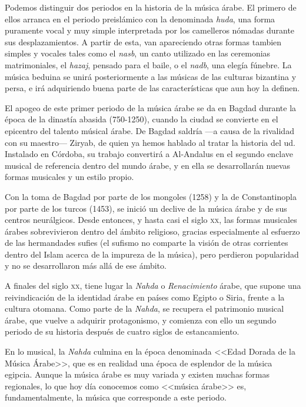     Podemos distinguir dos periodos en la historia de la música árabe. El primero de ellos arranca en el periodo preislámico con la denominada \emph{huda}, una forma puramente vocal y muy simple interpretada por los camelleros nómadas durante sus desplazamientos. A partir de esta, van apareciendo otras formas tambien simples y vocales tales como el \emph{nasb}, un canto utilizado en las ceremonias matrimoniales, el \emph{hazaj}, pensado para el baile, o el \emph{nadb}, una elegía fúnebre. La música beduina se unirá posteriormente a las músicas de las culturas bizantina y persa, e irá adquiriendo buena parte de las características que aun hoy la definen.

    El apogeo de este primer periodo de la música árabe se da en Bagdad durante la época de la dinastía abasida (750-1250), cuando la ciudad se convierte en el epicentro del talento músical árabe. De Bagdad saldría ---a causa de la rivalidad con su maestro--- Ziryab, de quien ya hemos hablado al tratar la historia del ud. Instalado en Córdoba, su trabajo convertirá a Al-Andalus en el segundo enclave musical de referencia dentro del mundo árabe, y en ella se desarrollarán nuevas formas musicales y un estilo propio.

    Con la toma de Bagdad por parte de los mongoles (1258) y la de Constantinopla por parte de los turcos (1453), se inició un declive de la música árabe y de sus centros neurálgicos. Desde entonces, y hasta casi el siglo \textsc{xx}, las formas musicales árabes sobrevivieron dentro del ámbito religioso, gracias especialmente al esfuerzo de las hermandades sufies (el sufismo no comparte la visión de otras corrientes dentro del Islam acerca de la impureza de la música), pero perdieron popularidad y no se desarrollaron más allá de ese ámbito.

    A finales del siglo \textsc{xx}, tiene lugar la \emph{Nahda} o \emph{Renacimiento} árabe, que supone una reivindicación de la identidad árabe en países como Egipto o Siria, frente a la cultura otomana. Como parte de la \emph{Nahda}, se recupera el patrimonio musical árabe, que vuelve a adquirir protagonismo, y comienza con ello un segundo periodo de su historia después de cuatro siglos de estancamiento.

    En lo musical, la \emph{Nahda} culmina en la época denominada <<Edad Dorada de la Música Árabe>>, que es en realidad una época de esplendor de la música egipcia. Aunque la música árabe es muy variada y existen muchas formas regionales, lo que hoy día conocemos como <<música árabe>> es, fundamentalmente, la música que corresponde a este periodo.


